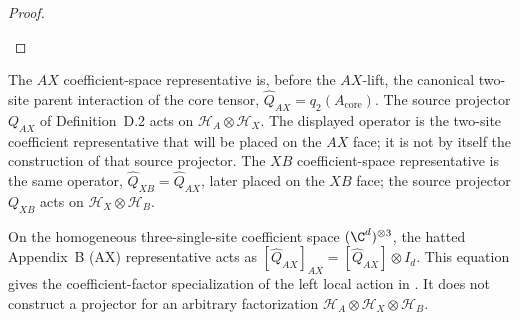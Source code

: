 \begin{proof}
\begin{center}
\begin{tenkz}[rows={wire}, cols=5, west=open, east=open, physical=up]
        \end{tenkz}
    \end{center}
\end{proof}

\begin{definition}
    \label{def:appendixB_qax}
    \leanok
    The $AX$ coefficient-space representative is, before the $AX$-lift,
    the canonical two-site parent interaction of the core tensor,
    $\widehat Q_{AX}=q_2(A_{\mathrm{core}})$.
    The source projector $Q_{AX}$ of Definition~D.2 acts on
    $\mathcal H_A\otimes\mathcal H_X$. The displayed operator is the
    two-site coefficient representative that will be placed on the $AX$ face;
    it is not by itself the construction of that source projector.
    The $XB$ coefficient-space representative is the same operator,
    $\widehat Q_{XB}=\widehat Q_{AX}$, later placed on the $XB$ face; the
    source projector $Q_{XB}$ acts on $\mathcal H_X\otimes\mathcal H_B$.
\end{definition}

\begin{lemma}
    \label{thm:appendixB_qax_factor_action}
    \leanok
    On the homogeneous three-single-site coefficient space
    $(\C^d)^{\otimes3}$, the hatted Appendix~B (AX) representative acts as
    $[\widehat Q_{AX}]_{AX} =[\widehat Q_{AX}]\otimes I_d$.
    This equation gives the coefficient-factor specialization of the left
    local action in \cite[Definition~D.2]{Cirac2016MPDO_arXiv}. It does not
    construct a projector for an arbitrary factorization
    $\mathcal H_A\otimes\mathcal H_X\otimes\mathcal H_B$.
\end{lemma}


